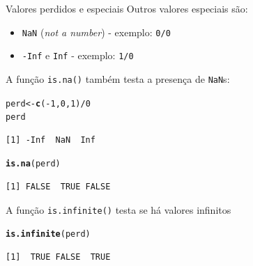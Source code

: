 \documentclass[10pt,handout]{beamer}\usepackage[]{graphicx}\usepackage[]{color}
\makeatletter
\newcommand{\hlnum}[1]{\textcolor[rgb]{0.686,0.059,0.569}{#1}}%
\newcommand{\hlopt}[1]{\textcolor[rgb]{0,0,0}{#1}}%
\newcommand{\hlstd}[1]{\textcolor[rgb]{0.345,0.345,0.345}{#1}}%
\newcommand{\hlkwb}[1]{\textcolor[rgb]{0.69,0.353,0.396}{#1}}%
\newcommand{\hlkwd}[1]{\textcolor[rgb]{0.282,0.239,0.545}{\textbf{#1}}}%
\newenvironment{kframe}{%
 \def\at@end@of@kframe{}%
 \ifinner\ifhmode%
  \def\at@end@of@kframe{\end{minipage}}%
  \begin{minipage}{\columnwidth}%
 \fi\fi%
 \def\FrameCommand##1{\hskip\@totalleftmargin \hskip-\fboxsep
 \colorbox{shadecolor}{##1}\hskip-\fboxsep
     \hskip-\linewidth \hskip-\@totalleftmargin \hskip\columnwidth}%
 \MakeFramed {\advance\hsize-\width
   \@totalleftmargin\z@ \linewidth\hsize
   \@setminipage}}%
 {\par\unskip\endMakeFramed%
 \at@end@of@kframe}
\newenvironment{knitrout}{}{} %
\makeatother
\begin{document}
\begin{frame}[fragile]{Valores perdidos e especiais}
Outros valores especiais são:
\begin{itemize}
\item \texttt{NaN} (\textit{not a number}) - exemplo: \texttt{0/0}
\item \texttt{-Inf} e \texttt{Inf} - exemplo: \texttt{1/0}
\end{itemize}
A função \texttt{is.na()} também testa a presença de \texttt{NaN}s:
\begin{knitrout}\small
{}\color{fgcolor}\begin{kframe}
\begin{alltt}
\hlstd{perd} \hlkwb{<-} \hlkwd{c}\hlstd{(}\hlopt{-}\hlnum{1}\hlstd{,}\hlnum{0}\hlstd{,}\hlnum{1}\hlstd{)}\hlopt{/}\hlnum{0}
\hlstd{perd}
\end{alltt}
\begin{verbatim}
[1] -Inf  NaN  Inf
\end{verbatim}
\begin{alltt}
\hlkwd{is.na}\hlstd{(perd)}
\end{alltt}
\begin{verbatim}
[1] FALSE  TRUE FALSE
\end{verbatim}
\end{kframe}
\end{knitrout}

A função \verb|is.infinite()| testa se há valores infinitos
\begin{knitrout}\small
{}\color{fgcolor}\begin{kframe}
\begin{alltt}
\hlkwd{is.infinite}\hlstd{(perd)}
\end{alltt}
\begin{verbatim}
[1]  TRUE FALSE  TRUE
\end{verbatim}
\end{kframe}
\end{knitrout}

\end{frame}
\end{document}
